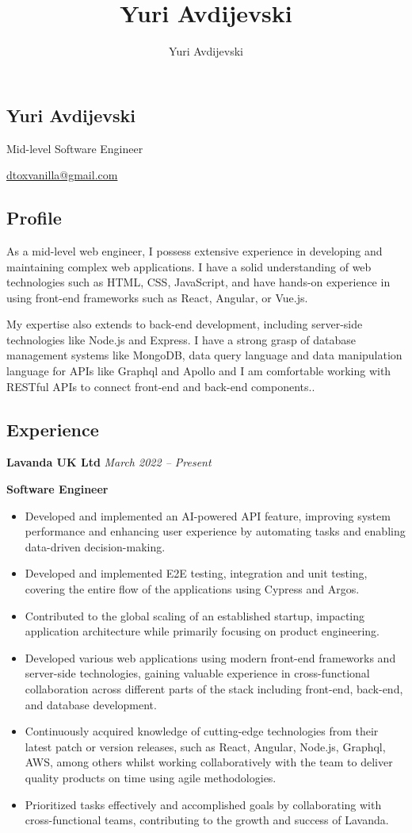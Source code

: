 \documentclass[11pt, oneside]{article}
\title{Yuri Avdijevski}
\author{Yuri Avdijevski}
\begin{document}
\begin{center}
\section*{Yuri Avdijevski}
Mid-level Software Engineer

\href{dtoxvanilla@gmail.com}{dtoxvanilla@gmail.com}
\end{center}

\subsection*{Profile}

As a mid-level web engineer, I possess extensive experience in developing and maintaining complex web applications. I have a solid understanding of web technologies such as HTML, CSS, JavaScript, and have hands-on experience in using front-end frameworks such as React, Angular, or Vue.js.

My expertise also extends to back-end development, including server-side technologies like Node.js and Express. I have a strong grasp of database management systems like MongoDB, data query language and data manipulation language for APIs like Graphql and Apollo and I am comfortable working with RESTful APIs to connect front-end and back-end components..

\medskip
\subsection*{Experience}

\textbf{Lavanda UK Ltd}
\hfill
\textit{March 2022 – Present}

\textbf{Software Engineer}

\begin{itemize}
  \item Developed and implemented an AI-powered API feature, improving system performance and enhancing user experience by automating tasks and enabling data-driven decision-making.
  \item Developed and implemented E2E testing, integration and unit testing, covering the entire flow of the applications using Cypress and Argos.
  \item Contributed to the global scaling of an established startup, impacting application architecture while primarily focusing on product engineering.
  \item Developed various web applications using modern front-end frameworks and server-side technologies, gaining valuable experience in cross-functional collaboration across different parts of the stack including front-end, back-end, and database development.
  \item Continuously acquired knowledge of cutting-edge technologies from their latest patch or version releases, such as React, Angular, Node.js, Graphql, AWS, among others whilst working collaboratively with the team to deliver quality products on time using agile methodologies.
  \item Prioritized tasks effectively and accomplished goals by collaborating with cross-functional teams, contributing to the growth and success of Lavanda.
\end{itemize}
\end{document}
